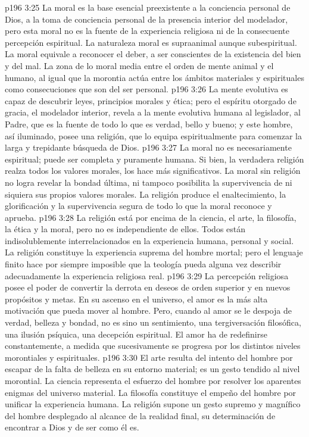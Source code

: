 \vs p196 3:25 La moral es la base esencial preexistente a la conciencia personal de Dios, a la toma de conciencia personal de la presencia interior del modelador, pero esta moral no es la fuente de la experiencia religiosa ni de la consecuente percepción espiritual. La naturaleza moral es supraanimal aunque subespiritual. La moral equivale a reconocer el deber, a ser conscientes de la existencia del bien y del mal. La zona de lo moral media entre el orden de mente animal y el humano, al igual que la morontia actúa entre los ámbitos materiales y espirituales como consecuciones que son del ser personal.
\vs p196 3:26 La mente evolutiva es capaz de descubrir leyes, principios morales y ética; pero el espíritu otorgado de gracia, el modelador interior, revela a la mente evolutiva humana al legislador, al Padre, que es la fuente de todo lo que es verdad, bello y bueno; y este hombre, así iluminado, posee una religión, que lo equipa espiritualmente para comenzar la larga y trepidante búsqueda de Dios.
\vs p196 3:27 La moral no es necesariamente espiritual; puede ser completa y puramente humana. Si bien, la verdadera religión realza todos los valores morales, los hace más significativos. La moral sin religión no logra revelar la bondad última, ni tampoco posibilita la supervivencia de ni siquiera sus propios valores morales. La religión produce el enaltecimiento, la glorificación y la supervivencia segura de todo lo que la moral reconoce y aprueba.
\vs p196 3:28 La religión está por encima de la ciencia, el arte, la filosofía, la ética y la moral, pero no es independiente de ellos. Todos están indisolublemente interrelacionados en la experiencia humana, personal y social. La religión constituye la experiencia suprema del hombre mortal; pero el lenguaje finito hace por siempre imposible que la teología pueda alguna vez describir adecuadamente la experiencia religiosa real.
\vs p196 3:29 \pc La percepción religiosa posee el poder de convertir la derrota en deseos de orden superior y en nuevos propósitos y metas. En su ascenso en el universo, el amor es la más alta motivación que pueda mover al hombre. Pero, cuando al amor se le despoja de verdad, belleza y bondad, no es sino un sentimiento, una tergiversación filosófica, una ilusión psíquica, una decepción espiritual. El amor ha de redefinirse constantemente, a medida que sucesivamente se progresa por los distintos niveles morontiales y espirituales.
\vs p196 3:30 \pc El arte resulta del intento del hombre por escapar de la falta de belleza en su entorno material; es un gesto tendido al nivel morontial. La ciencia representa el esfuerzo del hombre por resolver los aparentes enigmas del universo material. La filosofía constituye el empeño del hombre por unificar la experiencia humana. La religión supone un gesto supremo y magnífico del hombre desplegado al alcance de la realidad final, su determinación de encontrar a Dios y de ser como él es.
